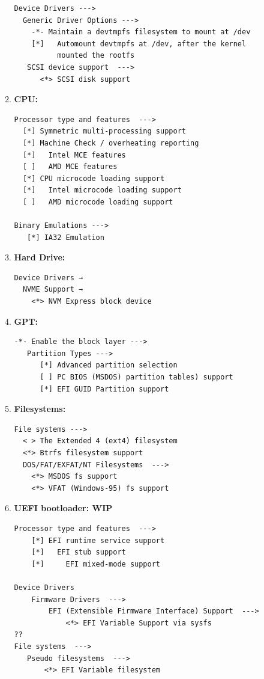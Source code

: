 \documentclass[10pt, a4paper, onecolumn, oneside, titlepage, openany]{book}
\begin{document}
\begin{enumerate}
\begin{enumerate}
\begin{Verbatim}[commandchars=\\\{\}]
Device Drivers --->
  Generic Driver Options --->
    -*- Maintain a devtmpfs filesystem to mount at /dev
    [*]   Automount devtmpfs at /dev, after the kernel
          mounted the rootfs
   SCSI device support  --->
      <*> SCSI disk support
\end{Verbatim}
        \item \textbf{CPU:}
\begin{Verbatim}[commandchars=\\\{\}]
Processor type and features  --->
  [*] Symmetric multi-processing support
  [*] Machine Check / overheating reporting
  [*]   Intel MCE features
  [ ]   AMD MCE features
  [*] CPU microcode loading support
  [*]   Intel microcode loading support
  [ ]   AMD microcode loading support

Binary Emulations --->
   [*] IA32 Emulation
\end{Verbatim}
        \item \textbf{Hard Drive:}
\begin{Verbatim}[commandchars=\\\{\}]
Device Drivers →
  NVME Support →
    <*> NVM Express block device
\end{Verbatim}
    \item \textbf{GPT:}
\begin{Verbatim}[commandchars=\\\{\}]
-*- Enable the block layer --->
   Partition Types --->
      [*] Advanced partition selection
      [ ] PC BIOS (MSDOS) partition tables) support
      [*] EFI GUID Partition support
\end{Verbatim}
        \item \textbf{Filesystems:}
\begin{Verbatim}[commandchars=\\\{\}]
File systems --->
  < > The Extended 4 (ext4) filesystem
  <*> Btrfs filesystem support
  DOS/FAT/EXFAT/NT Filesystems  --->
    <*> MSDOS fs support
    <*> VFAT (Windows-95) fs support
\end{Verbatim}
        \item \textbf{UEFI bootloader: WIP}
\begin{Verbatim}[commandchars=\\\{\}]
Processor type and features  --->
    [*] EFI runtime service support
    [*]   EFI stub support
    [*]     EFI mixed-mode support

Device Drivers
    Firmware Drivers  --->
        EFI (Extensible Firmware Interface) Support  --->
            <*> EFI Variable Support via sysfs
??
File systems  --->
   Pseudo filesystems  --->
       <*> EFI Variable filesystem


\end{Verbatim}
\end{enumerate}
\end{enumerate}
\end{document}
